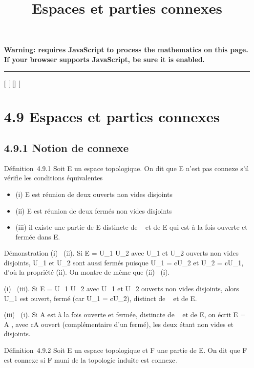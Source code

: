 \documentclass[]{article}
\title{Espaces et parties connexes}
\author{}
\date{}
\begin{document}
\maketitle

\textbf{Warning: 
requires JavaScript to process the mathematics on this page.\\ If your
browser supports JavaScript, be sure it is enabled.}

\begin{center}\rule{3in}{0.4pt}\end{center}

[
[
[]
[

\section{4.9 Espaces et parties connexes}

\subsection{4.9.1 Notion de connexe}

Définition~4.9.1 Soit E un espace topologique. On dit que E n'est pas
connexe s'il vérifie les conditions équivalentes

\begin{itemize}
\itemsep1pt\parskip0pt
\item
  (i) E est réunion de deux ouverts non vides disjoints
\item
  (ii) E est réunion de deux fermés non vides disjoints
\item
  (iii) il existe une partie de E distincte de \varnothing~ et de E qui est à la
  fois ouverte et fermée dans E.
\end{itemize}

Démonstration (i) \rigtharrow~(ii). Si E = U_1 \cup U_2 avec
U_1 et U_2 ouverts non vides disjoints, U_1
et U_2 sont aussi fermés puisque U_1 = cU_2
et U_2 = cU_1, d'où la propriété (ii). On montre de
même que (ii) \rigtharrow~(i).

(i) \rigtharrow~(iii). Si E = U_1 \cup U_2 avec U_1 et
U_2 ouverts non vides disjoints, alors U_1 est ouvert,
fermé (car U_1 = cU_2), distinct de \varnothing~ et de E.

(iii) \rigtharrow~(i). Si A est à la fois ouverte et fermée, distincte de \varnothing~ et de
E, on écrit E = A \cupcA, avec cA ouvert (complémentaire d'un fermé), les
deux étant non vides et disjoints.

Définition~4.9.2 Soit E un espace topologique et F une partie de E. On
dit que F est connexe si F muni de la topologie induite est connexe.
\end{document}
